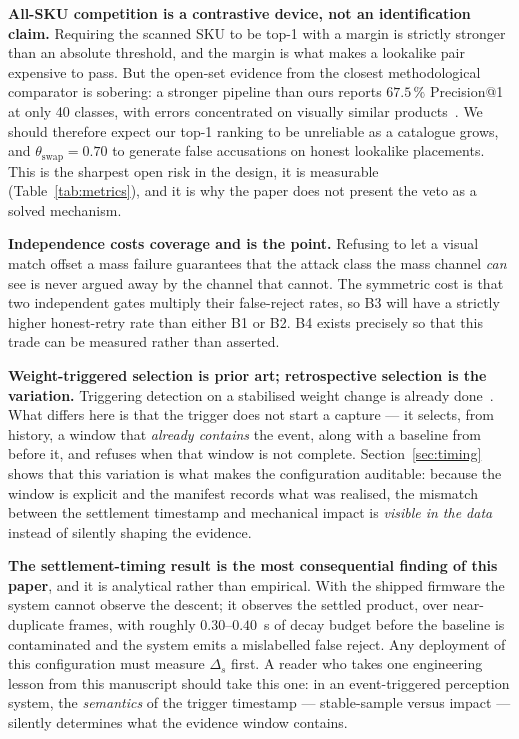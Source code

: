\documentclass[conference]{IEEEtran}
\begin{document}
\textbf{All-SKU competition is a contrastive device, not an identification claim.} Requiring the
scanned SKU to be top-1 with a margin is strictly stronger than an absolute threshold, and the margin
is what makes a lookalike pair expensive to pass. But the open-set evidence from the closest
methodological comparator is sobering: a stronger pipeline than ours reports $67.5\,\%$ Precision@1 at
only 40 classes, with errors concentrated on visually similar products~\cite{R07}. We should therefore
expect our top-1 ranking to be unreliable as a catalogue grows, and $\theta_{\mathrm{swap}}=0.70$ to
generate false accusations on honest lookalike placements. This is the sharpest open risk in the
design, it is measurable (Table~\ref{tab:metrics}), and it is why the paper does not present the veto
as a solved mechanism.

\textbf{Independence costs coverage and is the point.} Refusing to let a visual match offset a mass
failure guarantees that the attack class the mass channel \emph{can} see is never argued away by the
channel that cannot. The symmetric cost is that two independent gates multiply their false-reject
rates, so B3 will have a strictly higher honest-retry rate than either B1 or B2. B4 exists precisely so
that this trade can be measured rather than asserted.

\textbf{Weight-triggered selection is prior art; retrospective selection is the variation.} Triggering
detection on a stabilised weight change is already done~\cite{R01}. What differs here is that the
trigger does not start a capture --- it selects, from history, a window that \emph{already contains}
the event, along with a baseline from before it, and refuses when that window is not complete.
Section~\ref{sec:timing} shows that this variation is what makes the configuration auditable: because
the window is explicit and the manifest records what was realised, the mismatch between the settlement
timestamp and mechanical impact is \emph{visible in the data} instead of silently shaping the evidence.

\textbf{The settlement-timing result is the most consequential finding of this paper}, and it is
analytical rather than empirical. With the shipped firmware the system cannot observe the descent; it
observes the settled product, over near-duplicate frames, with roughly $0.30$--$0.40$~s of decay
budget before the baseline is contaminated and the system emits a mislabelled false reject. Any
deployment of this configuration must measure $\Delta_s$ first. A reader who takes one engineering
lesson from this manuscript should take this one: in an event-triggered perception system, the
\emph{semantics} of the trigger timestamp --- stable-sample versus impact --- silently determines what
the evidence window contains.
\end{document}
